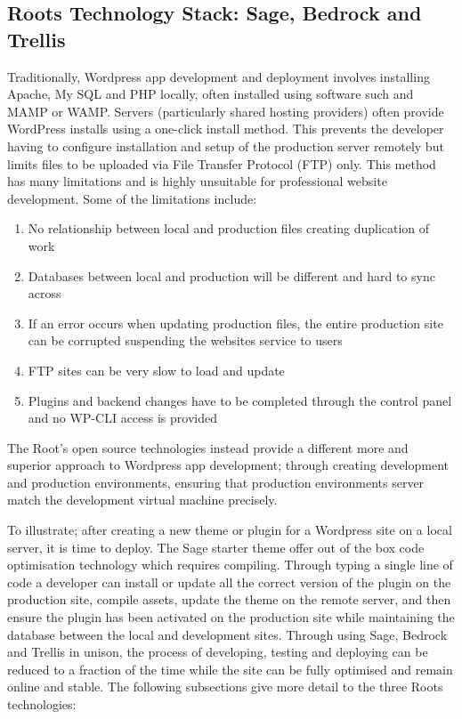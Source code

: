 \documentclass[fontsize=11pt]{extarticle}
\numberwithin{figure}{section} %
\numberwithin{table}{section}%
\providecommand{\tightlist}{%
  \setlength{\itemsep}{0pt}\setlength{\parskip}{0pt}}
\begin{document}
\hypertarget{roots-technology-stack-sage-bedrock-and-trellis}{%
\subsection{Roots Technology Stack: Sage, Bedrock and
Trellis}\label{roots-technology-stack-sage-bedrock-and-trellis}}

Traditionally, Wordpress app development and deployment involves
installing Apache, My SQL and PHP locally, often installed using
software such and MAMP or WAMP. Servers (particularly shared hosting
providers) often provide WordPress installs using a one-click install
method. This prevents the developer having to configure installation and
setup of the production server remotely but limits files to be uploaded
via File Transfer Protocol (FTP) only. This method has many limitations
and is highly unsuitable for professional website development. Some of
the limitations include:

\begin{enumerate}

\tightlist
\item
  No relationship between local and production files creating
  duplication of work
\item
  Databases between local and production will be different and hard to
  sync across
\item
  If an error occurs when updating production files, the entire
  production site can be corrupted suspending the websites service to
  users
\item
  FTP sites can be very slow to load and update
\item
  Plugins and backend changes have to be completed through the control
  panel and no WP-CLI access is provided \cite{p13}
\end{enumerate}

The Root's open source technologies instead provide a different more and
superior approach to Wordpress app development; through creating
development and production environments, ensuring that production
environments server match the development virtual machine precisely.

To illustrate; after creating a new theme or plugin for a Wordpress site
on a local server, it is time to deploy. The Sage starter theme offer
out of the box code optimisation technology which requires compiling.
Through typing a single line of code a developer can install or update
all the correct version of the plugin on the production site, compile
assets, update the theme on the remote server, and then ensure the
plugin has been activated on the production site while maintaining the
database between the local and development sites. Through using Sage,
Bedrock and Trellis in unison, the process of developing, testing and
deploying can be reduced to a fraction of the time while the site can be
fully optimised and remain online and stable. The following subsections
give more detail to the three Roots technologies:
\end{document}
